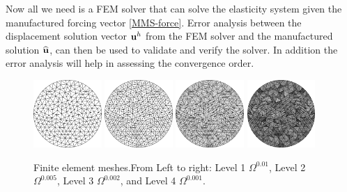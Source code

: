 \begin{itemize}
Now all we need is a FEM solver that can solve the elasticity system given the manufactured forcing vector \eqref{MMS-force}. Error analysis between the displacement solution vector ${\textbf{u}}^h$ from the FEM solver and the manufactured solution $\widehat{\textbf{u}}$, can then be used to validate and verify the solver. In addition the error analysis will help in assessing the convergence order.  

\end{itemize}

 \begin{figure}[t]
 \centering
 \includegraphics[width=0.23\textwidth]{./Images/M0.png}
  \includegraphics[width=0.23\textwidth]{./Images/M1.png}
  \includegraphics[width=0.23\textwidth]{./Images/M2.png}
  \includegraphics[width=0.23\textwidth]{./Images/M4.png}
 \caption{Finite element meshes.From Left to right: Level 1 $\Omega^{0.01}$, Level 2 $\Omega^{0.005}$, Level 3 $\Omega^{0.002}$, and Level 4 $\Omega^{0.001}$.  }\label{fig:4meshes}
 \end{figure}
	
